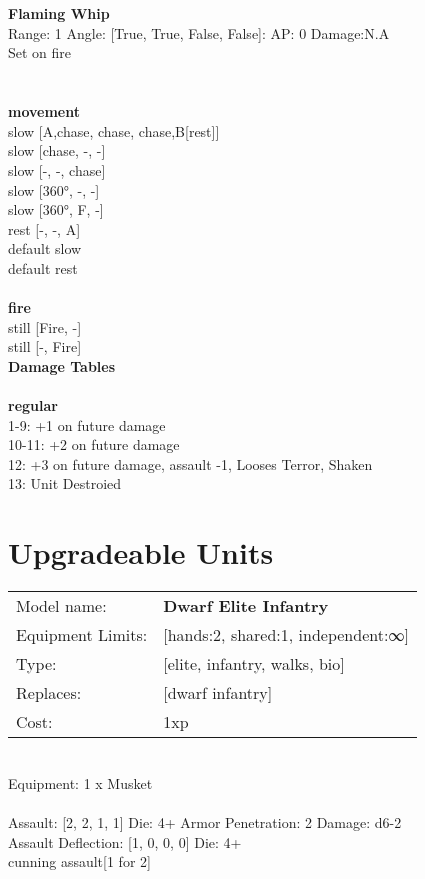 \ \\

\ \\
{\bf Flaming Whip } \\



Range: 1  Angle: [True, True, False, False]: AP: 0 Damage:N.A \\
Set on fire\\ 




 
\ \\



\ \\ {\bf movement } \\
slow [A,chase, chase, chase,B[rest]] \\
slow [chase, -, -] \\
slow [-, -, chase] \\
slow [360°, -, -] \\
slow [360°, F, -] \\
rest [-, -, A] \\
default slow \\
default rest \\
\ \\ {\bf fire } \\
still [Fire, -] \\
still [-, Fire] \\


{\bf Damage Tables} \\
\ \\ {\bf regular } \\
1-9: +1 on future damage \\
10-11: +2 on future damage \\
12: +3 on future damage, assault -1, Looses Terror, Shaken \\
13: Unit Destroied \\










\pagebreak\section{Upgradeable Units}\noindent
\begin{tabular}{ll}
Model name: &{\bf Dwarf Elite Infantry } \\
Equipment Limits: &[hands:2, shared:1, independent:∞] \\
Type: &[elite, infantry, walks, bio] \\
Replaces: &[dwarf infantry] \\
Cost: & 1xp\\
\end{tabular}
\ \\
Equipment: 1 x Musket \\
\ \\
Assault: [2, 2, 1, 1] Die: 4+ Armor Penetration: 2 Damage: d6-2 \\
Assault Deflection: [1, 0, 0, 0] Die: 4+\\
\indent cunning assault[1 for 2]\\ 
 
